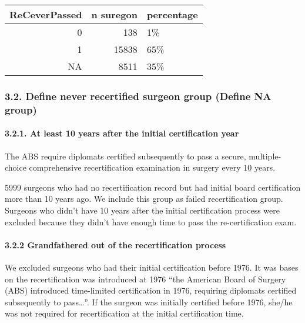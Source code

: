 \documentclass[
]{article}
\begin{document}
\begin{table}[H]
\centering
\begin{tabular}{r|r|l}
\hline
ReCeverPassed & n suregon & percentage\\
\hline
0 & 138 & 1\%\\
\hline
1 & 15838 & 65\%\\
\hline
NA & 8511 & 35\%\\
\hline
\end{tabular}
\end{table}

\hypertarget{define-never-recertified-surgeon-group-define-na-group}{%
\subsubsection{3.2. Define never recertified surgeon group (Define NA
group)}\label{define-never-recertified-surgeon-group-define-na-group}}

\hypertarget{at-least-10-years-after-the-initial-certification-year}{%
\paragraph{3.2.1. At least 10 years after the initial certification
year}\label{at-least-10-years-after-the-initial-certification-year}}

The ABS require diplomats certified subsequently to pass a secure,
multiple-choice comprehensive recertification examination in surgery
every 10 years.

5999 surgeons who had no recertification record but had initial board
certification more than 10 years ago. We include this group as failed
recertification group. Surgeons who didn't have 10 years after the
initial certification process were excluded because they didn't have
enough time to pass the re-certification exam.

\hypertarget{grandfathered-out-of-the-recertification-process}{%
\paragraph{3.2.2 Grandfathered out of the recertification
process}\label{grandfathered-out-of-the-recertification-process}}

We excluded surgeons who had their initial certification before 1976. It
was bases on the recertification was introduced at 1976 ``the American
Board of Surgery (ABS) introduced time-limited certification in 1976,
requiring diplomats certified subsequently to pass\ldots{}''. If the
surgeon was initially certified before 1976, she/he was not required for
recertification at the initial certification time.
\end{document}
